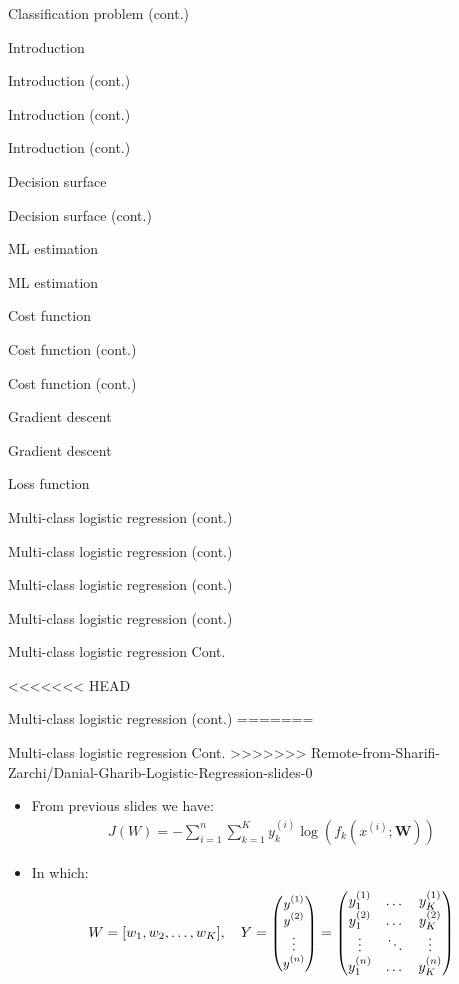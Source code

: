 \documentclass[serif, aspectratio=169]{beamer}
\begin{document}
\begin{frame}{Classification problem (cont.)}
\begin{itemize}
\begin{frame}{Introduction}
\begin{itemize}
\begin{frame}{Introduction (cont.)}
\begin{frame}{Introduction (cont.)}
\begin{frame}{Introduction (cont.)}
\begin{frame}{Decision surface}
\begin{itemize}
\begin{frame}{Decision surface (cont.)}
\begin{frame}{ML estimation}
\begin{frame}{ML estimation}
\begin{itemize}
\begin{frame}{Cost function}
\begin{frame}{Cost function (cont.)}
\begin{itemize}
\begin{itemize}
\begin{frame}{Cost function (cont.)}
\begin{frame}{Gradient descent}
\begin{frame}{Gradient descent}
\begin{frame}{Loss function}
\begin{frame}{Multi-class logistic regression (cont.)}
\begin{frame}{Multi-class logistic regression (cont.)}
\begin{frame}{Multi-class logistic regression (cont.)}
\begin{frame}{Multi-class logistic regression (cont.)}
\begin{frame}{Multi-class logistic regression Cont.}
\end{frame}
<<<<<<< HEAD
\begin{frame}{Multi-class logistic regression (cont.)}
=======
\begin{frame}{Multi-class logistic regression Cont.}
>>>>>>> Remote-from-Sharifi-Zarchi/Danial-Gharib-Logistic-Regression-slides-0
    \begin{itemize}
        \item From previous slides we have:
            \begin{align*}
                J(W) = -\sum_{i=1}^{n}\sum_{k=1}^{K}y_k^{(i)} \log (f_k(x^{(i)}; \mathbf{W}))
            \end{align*}
        \item In which:
             \[
        W = [w_1,w_2, \dots, w_K], \quad Y = 
        \text{\small $
        \begin{pmatrix}
            y^{(1)} \\
            y^{(2)} \\
            \vdots \\
            y^{(n)}
        \end{pmatrix}
        $}
        =
        \begin{pmatrix}
            y_1^{(1)} & \dots & y_K^{(1)} \\
            y_1^{(2)} & \dots & y_K^{(2)} \\
            \vdots    & \ddots & \vdots \\
            y_1^{(n)} & \dots & y_K^{(n)}
        \end{pmatrix}
    \]
    

\end{itemize}
\end{frame}
\end{frame}
\end{frame}
\end{frame}
\end{frame}
\end{frame}
\end{frame}
\end{frame}
\end{frame}
\end{frame}
\end{itemize}
\end{itemize}
\end{frame}
\end{frame}
\end{itemize}
\end{frame}
\end{frame}
\end{frame}
\end{itemize}
\end{frame}
\end{frame}
\end{frame}
\end{frame}
\end{itemize}
\end{frame}
\end{itemize}
\end{frame}
\end{document}
